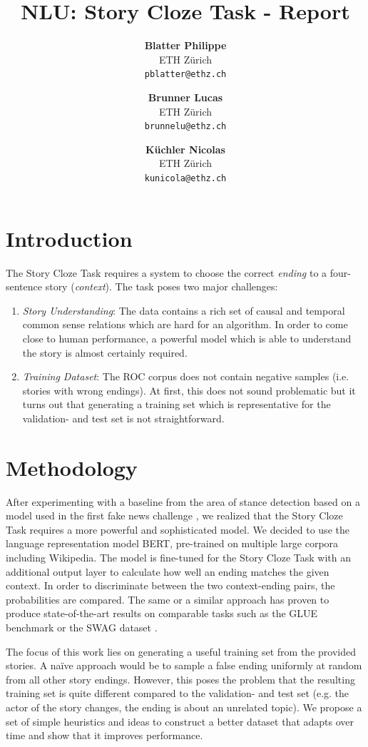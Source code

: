 \documentclass{article}
\title{NLU: Story Cloze Task - Report}
\author{
  \textbf{Blatter Philippe}\\
  ETH Zürich \\
  \texttt{pblatter@ethz.ch}
  \and
  \textbf{Brunner Lucas} \\
  ETH Zürich \\
  \texttt{brunnelu@ethz.ch}
  \and
  \textbf{Küchler Nicolas}\\
  ETH Zürich \\
  \texttt{kunicola@ethz.ch}
}
\begin{document}

\maketitle

\section{Introduction}

The Story Cloze Task \cite{SCT} requires a system to choose the correct \textit{ending} to a four-sentence story (\textit{context}).
The task poses two major challenges:

\begin{enumerate}
    \item \emph{Story Understanding}: The data contains a rich set of causal and temporal common sense relations which are hard for an algorithm.
    In order to come close to human performance, a powerful model which is able to understand the story is almost certainly required.
    \item \emph{Training Dataset}: The ROC corpus does not contain negative samples (i.e. stories with wrong endings). At first, this does not sound problematic but it turns out that generating a training set which is representative for the validation- and test set is not straightforward.
\end{enumerate}

\section{Methodology}

After experimenting with a baseline from the area of stance detection based on a model used in the first fake news challenge \cite{FNC}, we realized that the Story Cloze Task requires a more powerful and sophisticated model.
We decided to use the language representation model BERT, pre-trained on multiple large corpora including Wikipedia.
The model is fine-tuned for the Story Cloze Task with an additional output layer to calculate how well an ending matches the given context.
In order to discriminate between the two context-ending pairs, the probabilities are compared. The same or a similar approach has proven to produce state-of-the-art results on comparable tasks such as the GLUE benchmark or the SWAG dataset \cite{BERT}.

The focus of this work lies on generating a useful training set from the provided stories.
A naïve approach would be to sample a false ending uniformly at random from all other story endings.
However, this poses the problem that the resulting training set is quite different compared to the validation- and test set (e.g. the actor of the story changes, the ending is about an unrelated topic). We propose a set of simple heuristics and ideas to construct a better dataset that adapts over time and show that it improves performance.
\end{document}
